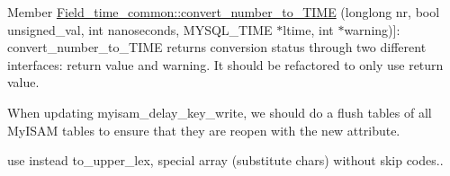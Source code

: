 \begin{DoxyRefList}
%
Member \mbox{\hyperlink{classField__time__common_ab30cf710ffb3f033da46e5e43430490d}{Field\+\_\+time\+\_\+common\+:\+:convert\+\_\+number\+\_\+to\+\_\+\+T\+I\+ME}} (longlong nr, bool unsigned\+\_\+val, int nanoseconds, M\+Y\+S\+Q\+L\+\_\+\+T\+I\+ME $\ast$ltime, int $\ast$warning)]\+: convert\+\_\+number\+\_\+to\+\_\+\+T\+I\+ME returns conversion status through two different interfaces\+: return value and warning. It should be refactored to only use return value.  
\item[\label{todo__todo000122}%
\Hypertarget{todo__todo000122}%
Member \mbox{\hyperlink{sys__vars_8cc_a995ff555f60375cf17a4408c516c43a2}{fix\+\_\+delay\+\_\+key\+\_\+write}} (\mbox{\hyperlink{classsys__var}{sys\+\_\+var}} $\ast$self, T\+HD $\ast$thd, enum\+\_\+var\+\_\+type type)]When updating myisam\+\_\+delay\+\_\+key\+\_\+write, we should do a \textquotesingle{}flush tables\textquotesingle{} of all My\+I\+S\+AM tables to ensure that they are reopen with the new attribute.  
\item[\label{todo__todo000017}%
\Hypertarget{todo__todo000017}%
File \mbox{\hyperlink{gen__lex__hash_8cc}{gen\+\_\+lex\+\_\+hash.cc}} ]use instead to\+\_\+upper\+\_\+lex, special array (substitute chars) without skip codes.. 


\end{DoxyRefList}

